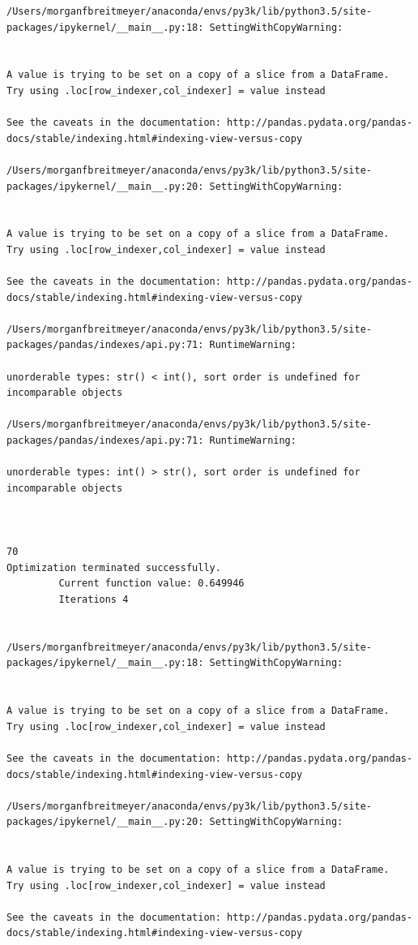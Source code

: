 \begin{lstlisting}
/Users/morganfbreitmeyer/anaconda/envs/py3k/lib/python3.5/site-packages/ipykernel/__main__.py:18: SettingWithCopyWarning:


A value is trying to be set on a copy of a slice from a DataFrame.
Try using .loc[row_indexer,col_indexer] = value instead

See the caveats in the documentation: http://pandas.pydata.org/pandas-docs/stable/indexing.html#indexing-view-versus-copy

/Users/morganfbreitmeyer/anaconda/envs/py3k/lib/python3.5/site-packages/ipykernel/__main__.py:20: SettingWithCopyWarning:


A value is trying to be set on a copy of a slice from a DataFrame.
Try using .loc[row_indexer,col_indexer] = value instead

See the caveats in the documentation: http://pandas.pydata.org/pandas-docs/stable/indexing.html#indexing-view-versus-copy

/Users/morganfbreitmeyer/anaconda/envs/py3k/lib/python3.5/site-packages/pandas/indexes/api.py:71: RuntimeWarning:

unorderable types: str() < int(), sort order is undefined for incomparable objects

/Users/morganfbreitmeyer/anaconda/envs/py3k/lib/python3.5/site-packages/pandas/indexes/api.py:71: RuntimeWarning:

unorderable types: int() > str(), sort order is undefined for incomparable objects



70
Optimization terminated successfully.
         Current function value: 0.649946
         Iterations 4


/Users/morganfbreitmeyer/anaconda/envs/py3k/lib/python3.5/site-packages/ipykernel/__main__.py:18: SettingWithCopyWarning:


A value is trying to be set on a copy of a slice from a DataFrame.
Try using .loc[row_indexer,col_indexer] = value instead

See the caveats in the documentation: http://pandas.pydata.org/pandas-docs/stable/indexing.html#indexing-view-versus-copy

/Users/morganfbreitmeyer/anaconda/envs/py3k/lib/python3.5/site-packages/ipykernel/__main__.py:20: SettingWithCopyWarning:


A value is trying to be set on a copy of a slice from a DataFrame.
Try using .loc[row_indexer,col_indexer] = value instead

See the caveats in the documentation: http://pandas.pydata.org/pandas-docs/stable/indexing.html#indexing-view-versus-copy


\end{lstlisting}
